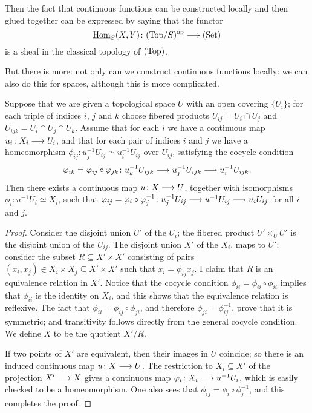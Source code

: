 \begin{4   STACKS}
\begin{4.1 Descent of objects of fibcats}
Then the fact that continuous functions can be constructed locally and then glued together can be expressed by saying that the functor
   \[
   \underhom_S(X, Y) \colon \catover{Top}{S}
   \op \arr \catset
   \]
is a sheaf in the classical topology of $(\mathrm{Top})$.

But there is more: not only can we construct continuous functions locally: we can also do this for spaces, although this is more complicated.

\begin{proposition}\label{prop:gluing-top}
Suppose that we are given a topological space $U$ with an open covering $\{U_i\}$; for each triple of indices $i$, $j$ and $k$ choose fibered products $U_{ij} = U_i \cap U_j$ and $U_{ijk} = U_i \cap U_j \cap U_k$. Assume that for each $i$ we have a continuous map $u_i \colon X_i \arr U_i$, and that for each pair of indices $i$ and $j$ we have a homeomorphism $\phi_{ij} \colon u_j^{-1}U_{ij} \simeq u_i^{-1}U_{ij}$ over $U_{ij}$, satisfying the cocycle condition
   \[
   \phi_{ik} = \phi_{ij} \circ \phi_{jk} \colon 
   u_k^{-1}U_{ijk} \arr 
   u_j^{-1}U_{ijk} \arr
   u_i^{-1}U_{ijk}.
   \]
Then there exists a continuous map $u \colon X \arr U$, together with isomorphisms $\phi_i \colon u^{-1} U_i \simeq X_i$, such that $\phi_{ij} = \phi_i \circ \phi_j^{-1} \colon u_j^{-1}U_{ij} \arr u^{-1}U_{ij} \arr u_iU_{ij}$ for all $i$ and $j$.
\end{proposition}

\begin{proof}
Consider the disjoint union $U'$ of the $U_i$; the fibered product $U' \times_U U'$ is the disjoint union of the $U_{ij}$. The disjoint union $X'$ of the $X_i$, maps to $U'$; consider the subset $R \subseteq X' \times X'$ consisting of pairs $(x_i, x_j) \in X_i \times X_j \subseteq X' \times X'$ such that $x_i = \phi_{ij} x_j$. I claim that $R$ is an equivalence relation in $X'$. Notice that the cocycle condition $\phi_{ii} = \phi_{ii} \circ \phi_{ii}$ implies that $\phi_{ii}$ is the identity on $X_i$, and this shows that the equivalence relation is reflexive. The fact that $\phi_{ii} = \phi_{ij} \circ \phi_{ji}$, and therefore $\phi_{ji} = \phi_{ij}^{-1}$, prove that it is symmetric; and transitivity follows directly from the general cocycle condition. We define $X$ to be the quotient $X'/R$.

If two points of $X'$ are equivalent, then their images in $U$ coincide; so there is an induced continuous map $u \colon X \arr U$. The restriction to $X_i \subseteq X'$ of the projection $X'\arr X$ gives a continuous map $\phi_i \colon X_i \arr u^{-1}U_i$, which is easily checked to be a homeomorphism. One also sees that $\phi_{ij} = \phi_i \circ \phi_j^{-1}$, and this completes the proof.
\end{proof}


\end{4.1 Descent of objects of fibcats}
\end{4   STACKS}
